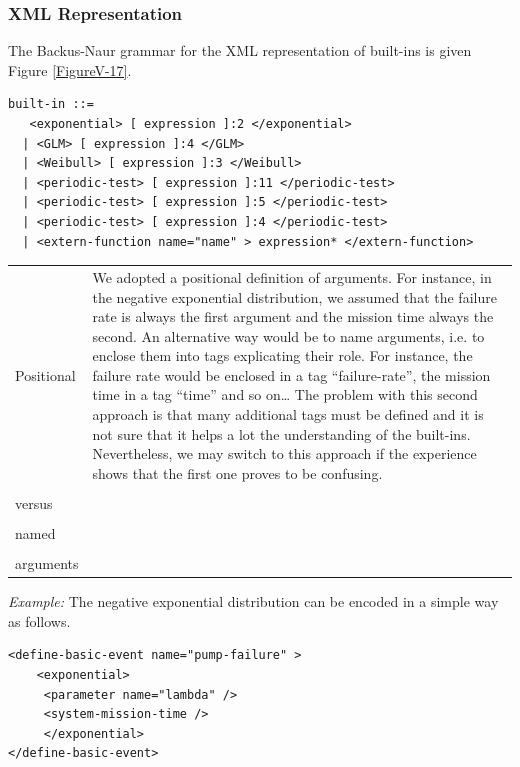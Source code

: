 \documentclass[11pt]{article}
\begin{document}
\subsubsection{XML Representation}
\label{sec:org9821d9f}

The Backus-Naur grammar for the XML representation of built-ins is given Figure \ref{FigureV-17}.


\begin{lstlisting}
built-in ::=
   <exponential> [ expression ]:2 </exponential>
  | <GLM> [ expression ]:4 </GLM>
  | <Weibull> [ expression ]:3 </Weibull>
  | <periodic-test> [ expression ]:11 </periodic-test>
  | <periodic-test> [ expression ]:5 </periodic-test>
  | <periodic-test> [ expression ]:4 </periodic-test>
  | <extern-function name="name" > expression* </extern-function>
\end{lstlisting}

\begin{center}
\begin{tabular}{ll}
Positional & We adopted a positional definition of arguments. For instance, in the negative exponential distribution, we assumed that the failure rate is always the first argument and the mission time always the second. An alternative way would be to name arguments, i.e. to enclose them into tags explicating their role. For instance, the failure rate would be enclosed in a tag ``failure-rate'', the mission time in a tag ``time'' and so on\ldots{} The problem with this second approach is that many additional tags must be defined and it is not sure that it helps a lot the understanding of the built-ins. Nevertheless, we may switch to this approach if the experience shows that the first one proves to be confusing.\\
 & \\
versus & \\
 & \\
named & \\
 & \\
arguments & \\
\end{tabular}
\end{center}

\emph{Example:} The negative exponential distribution can be encoded in a
simple way as follows.


\lstset{language=XML,label= ,caption= ,captionpos=b,numbers=none}
\begin{lstlisting}
<define-basic-event name="pump-failure" >
    <exponential>
	 <parameter name="lambda" />
	 <system-mission-time />
	 </exponential>
</define-basic-event>
\end{lstlisting}
\end{document}
